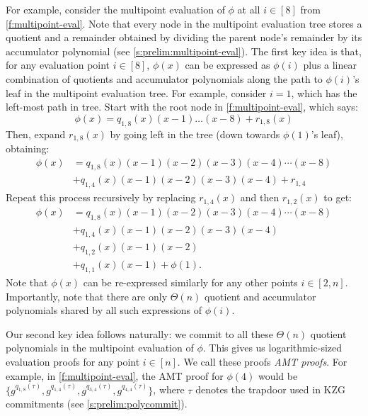 For example, consider the multipoint evaluation of $\phi$ at all $i\in[8]$ from \cref{f:multipoint-eval}.
Note that every node in the multipoint evaluation tree stores a quotient and a remainder obtained by dividing the parent node's remainder by its accumulator polynomial (see \cref{s:prelim:multipoint-eval}).
The first key idea is that, for any evaluation point $i\in[8]$, $\phi(x)$ can be expressed as $\phi(i)$ plus a linear combination of quotients and accumulator polynomials along the path to $\phi(i)$'s leaf in the multipoint evaluation tree.
For example, consider $i=1$, which has the left-most path in tree.
Start with the root node in \cref{f:multipoint-eval}, which says:
$$\phi(x)=q_{1,8}(x) (x-1)\dots(x-8) + r_{1,8}(x)$$
Then, expand $r_{1,8}(x)$ by going left in the tree (down towards $\phi(1)$'s leaf), obtaining:
\begin{align*}
\phi(x)& = q_{1,8}(x) (x-1)(x-2)(x-3)(x-4)\cdots(x-8) \\
       & + q_{1,4}(x) (x-1)(x-2)(x-3)(x-4) + r_{1,4}
\end{align*}
Repeat this process recursively by replacing $r_{1,4}(x)$ and then $r_{1,2}(x)$ to get:
\begin{align*}
\phi(x)& = q_{1,8}(x) (x-1)(x-2)(x-3)(x-4)\cdots(x-8) \\
       & + q_{1,4}(x) (x-1)(x-2)(x-3)(x-4) \\
       & + q_{1,2}(x) (x-1)(x-2) \\
       & + q_{1,1}(x)(x-1) + \phi(1).
\end{align*}
Note that $\phi(x)$ can be re-expressed similarly for any other points $i\in [2,n]$.
Importantly, note that there are only $\Theta(n)$ quotient and accumulator polynomials shared by all such expressions of $\phi(i)$.

Our second key idea follows naturally: we commit to all these $\Theta(n)$ quotient polynomials in the multipoint evaluation of $\phi$.
This gives us logarithmic-sized evaluation proofs for any point $i\in[n]$.
We call these proofs \textit{AMT proofs}.
For example, in \cref{f:multipoint-eval}, the AMT proof for $\phi(4)$ would be $\{g^{q_{1,8}(\tau)}, g^{q_{1,4}(\tau)}, g^{q_{3,4}(\tau)}, g^{q_{4,4}(\tau)}\}$, where $\tau$ denotes the trapdoor used in KZG commitments (see \cref{s:prelim:polycommit}).

